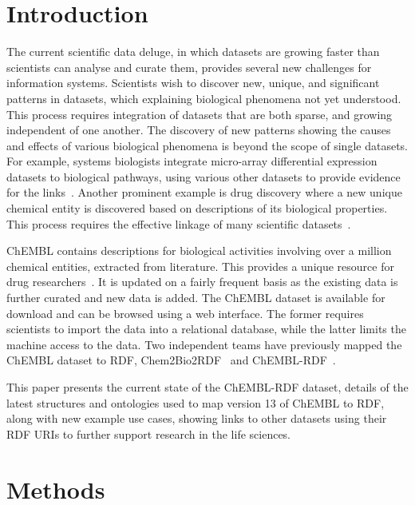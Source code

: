 \documentclass[sw]{iosart2c}
\begin{document}

\section{Introduction}\label{s1}


The current scientific data deluge, in which datasets are growing faster than scientists can analyse and 
curate them, provides several new challenges for information systems. Scientists wish to 
discover new, unique, and significant patterns in datasets, which explaining biological 
phenomena not yet understood. This process requires integration of datasets that are both 
sparse, and growing independent of one another. The discovery of new patterns showing the 
causes and effects of various biological phenomena is beyond the scope of single datasets.
For example, systems biologists integrate micro-array differential expression datasets to 
biological pathways, using various other datasets to provide evidence for the links~\cite{}. 
Another prominent example is drug discovery where a new unique chemical entity is discovered 
based on descriptions of its biological properties. This process requires the effective 
linkage of many scientific datasets~\cite{Samwald2011,OpenPHACTS}.

ChEMBL contains descriptions for biological activities involving over a million chemical 
entities, extracted from literature. This provides a unique resource for drug researchers~\cite{Gaulton2012,Warr2009}.
It is updated on a fairly frequent basis as the existing data is further curated and new data is added. 
The ChEMBL dataset is available for download and can be browsed using a web interface. 
The former requires scientists to import the data into a relational database, while the 
latter limits the machine access to the data. Two independent teams have previously mapped 
the ChEMBL dataset to RDF, Chem2Bio2RDF~\cite{Chen2010} and ChEMBL-RDF~\cite{Willighagen2011}.

This paper presents the current state of the ChEMBL-RDF dataset, details of the latest structures
and ontologies used to map version 13 of ChEMBL to RDF, along with new example use cases, showing 
links to other datasets using their RDF URIs to further support research in the life sciences.

\section{Methods}\label{s2}
\end{document}
